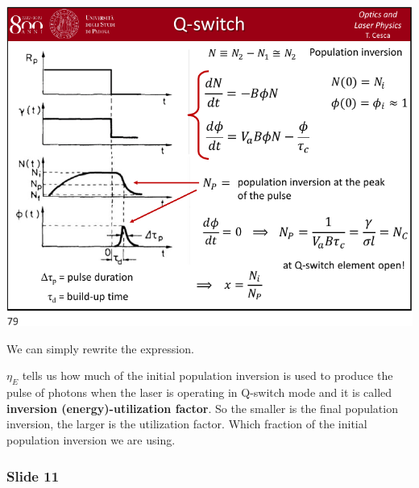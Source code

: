 \documentclass[../main/main.tex]{subfiles}
\begin{document}
\begin{minipage}[]{0.5\linewidth}
\centering
\includegraphics[page=10,width=1\textwidth]{../lessons/pdf_file/15_lecture.pdf}
\end{minipage}
\hspace{0.3cm}\vspace{0.3cm}
\begin{minipage}[c]{0.47\linewidth}

We can simply rewrite the expression.

\( \eta _E \) tells us how much of the initial population inversion is used to produce the pulse of photons when the laser is operating in Q-switch mode and it is called \textbf{inversion (energy)-utilization factor}.
So the smaller is the final population inversion, the larger is the utilization factor. Which fraction of the initial population inversion we are using.

\end{minipage}

\subsubsection*{Slide 11}
\end{document}

